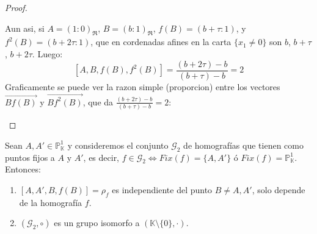 \begin{proof}
\begin{enumerate}
    Aun asi, si $A=(1:0)_\mathfrak{R}$, $B=(b:1)_\mathfrak{R}$, $f(B) = (b+\tau:1)$, y $f^2(B) = (b+2\tau:1)$, que en cordenadas afines en la carta $\{ x_1 \neq 0 \}$ son $b$, $b+\tau$, $b+2\tau$. Luego:
    \[
    [A, B, f(B), f^2(B)] =
    \frac{(b + 2 \tau) - b}{(b + \tau) - b} =
    2
    \]
    Graficamente se puede ver la razon simple (proporcion) entre los vectores $\vec{Bf(B)}$ y $\vec{Bf^2(B)}$, que da $\frac{(b + 2 \tau) - b}{(b + \tau) - b} = 2$:
    \begin{center}
    \end{center}
    \end{enumerate}
\end{proof}

\begin{proposición}
    Sean $A,A' \in \mathbb{P}^1_{\mathbb{K}}$ y consideremos el conjunto $\mathcal{G}_2$ de homografías que tienen como puntos fijos a $A$ y $A'$, es decir, $f \in \mathcal{G}_2 \iff Fix(f) = \{A,A'\}$ ó $Fix(f) = \mathbb{P}^1_{\mathbb{K}}$. Entonces:
    \begin{enumerate}
        \item $[A, A', B, f(B)] = \rho_f$ es independiente del punto $B \neq A, A'$, solo depende de la homografía $f$.
        \item $(\mathcal{G}_2, \circ)$ es un grupo isomorfo a $(\mathbb{K} \setminus \{0\}, \cdot)$.
    \end{enumerate}
\end{proposición}


